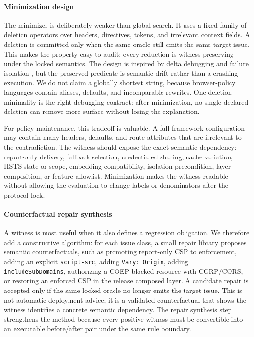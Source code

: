 \documentclass[10pt,conference]{IEEEtran}
\begin{document}
\paragraph{Minimization design}

The minimizer is deliberately weaker than global search. It uses a fixed family of deletion operators over headers, directives, tokens, and irrelevant context fields. A deletion is committed only when the same oracle still emits the same target issue. This makes the property easy to audit: every reduction is witness-preserving under the locked semantics. The design is inspired by delta debugging and failure isolation \cite{zeller_ddmin_2002}, but the preserved predicate is semantic drift rather than a crashing execution. We do not claim a globally shortest string, because browser-policy languages contain aliases, defaults, and incomparable rewrites. One-deletion minimality is the right debugging contract: after minimization, no single declared deletion can remove more surface without losing the explanation.

For policy maintenance, this tradeoff is valuable. A full framework configuration may contain many headers, defaults, and route attributes that are irrelevant to the contradiction. The witness should expose the exact semantic dependency: report-only delivery, fallback selection, credentialed sharing, cache variation, HSTS state or scope, embedding compatibility, isolation precondition, layer composition, or feature allowlist. Minimization makes the witness readable without allowing the evaluation to change labels or denominators after the protocol lock.

\paragraph{Counterfactual repair synthesis}

A witness is most useful when it also defines a regression obligation. We therefore add a constructive algorithm: for each issue class, a small repair library proposes semantic counterfactuals, such as promoting report-only CSP to enforcement, adding an explicit \texttt{script-src}, adding \texttt{Vary: Origin}, adding \texttt{includeSubDomains}, authorizing a COEP-blocked resource with CORP/CORS, or restoring an enforced CSP in the release composed layer. A candidate repair is accepted only if the same locked oracle no longer emits the target issue. This is not automatic deployment advice; it is a validated counterfactual that shows the witness identifies a concrete semantic dependency. The repair synthesis step strengthens the method because every positive witness must be convertible into an executable before/after pair under the same rule boundary.
\end{document}
